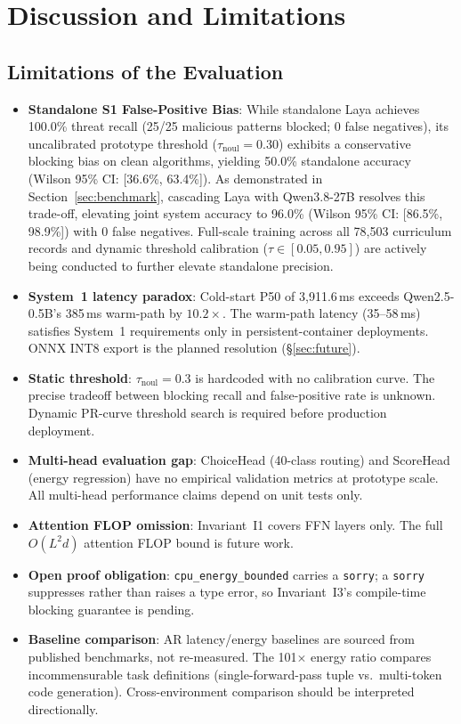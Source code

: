 \documentclass[conference]{IEEEtran}
\begin{document}
\section{Discussion and Limitations}
\label{sec:discussion}

\subsection{Limitations of the Evaluation}

\begin{itemize}
  \item \textbf{Standalone S1 False-Positive Bias}: While standalone Laya achieves 100.0\% threat recall (25/25 malicious patterns blocked; 0 false negatives), its uncalibrated prototype threshold ($\tau_\text{noul} = 0.30$) exhibits a conservative blocking bias on clean algorithms, yielding 50.0\% standalone accuracy (Wilson 95\% CI: [36.6\%, 63.4\%]). As demonstrated in Section~\ref{sec:benchmark}, cascading Laya with Qwen3.8-27B resolves this trade-off, elevating joint system accuracy to 96.0\% (Wilson 95\% CI: [86.5\%, 98.9\%]) with 0 false negatives. Full-scale training across all 78{,}503 curriculum records and dynamic threshold calibration ($\tau \in [0.05, 0.95]$) are actively being conducted to further elevate standalone precision.
  \item \textbf{System~1 latency paradox}: Cold-start P50 of 3{,}911.6\,ms exceeds
        Qwen2.5-0.5B's 385\,ms warm-path by $10.2\times$. The warm-path latency (35--58\,ms)
        satisfies System~1 requirements only in persistent-container deployments.
        ONNX INT8 export is the planned resolution (§\ref{sec:future}).
  \item \textbf{Static threshold}: $\tau_\text{noul}{=}0.3$ is hardcoded with no calibration
        curve. The precise tradeoff between blocking recall and false-positive rate is unknown.
        Dynamic PR-curve threshold search is required before production deployment.
  \item \textbf{Multi-head evaluation gap}: ChoiceHead (40-class routing) and ScoreHead
        (energy regression) have no empirical validation metrics at prototype scale.
        All multi-head performance claims depend on unit tests only.
  \item \textbf{Attention FLOP omission}: Invariant~I1 covers FFN layers only.
        The full $O(L^2 d)$ attention FLOP bound is future work.
  \item \textbf{Open proof obligation}: \texttt{cpu\_energy\_bounded} carries a
        \texttt{sorry}; a \texttt{sorry} suppresses rather than raises a type error,
        so Invariant~I3's compile-time blocking guarantee is pending.
  \item \textbf{Baseline comparison}: AR latency/energy baselines are sourced from
        published benchmarks, not re-measured. The 101$\times$ energy ratio compares
        incommensurable task definitions (single-forward-pass tuple vs.\ multi-token code generation).
        Cross-environment comparison should be interpreted directionally.
\end{itemize}
\end{document}

